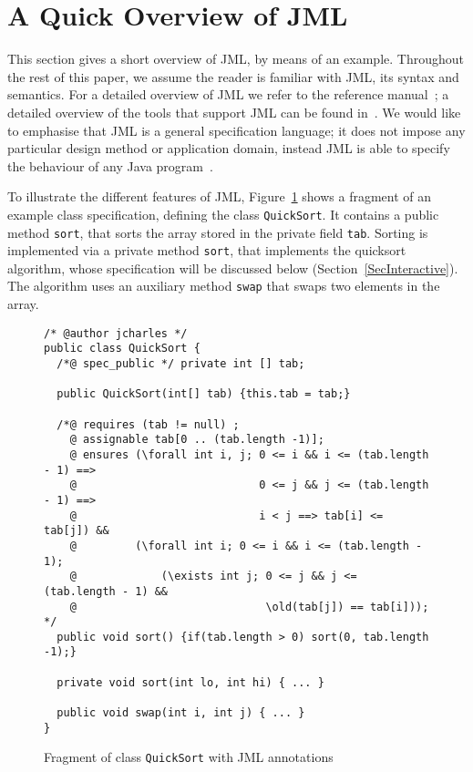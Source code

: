 \section{A Quick Overview of JML}\label{SecJML}


This section gives a short overview of JML, by means of an
example. Throughout the rest of this paper, we assume the reader is
familiar with JML, its syntax and semantics. For a detailed overview
of JML we refer to the reference manual~\cite{JMLReferenceManual05}; a
detailed overview of the tools that support JML can be found
in~\cite{BurdyCCEKLLP05}.  We would like to emphasise that JML is a
general specification language; it does not impose any particular
design method or application domain, instead JML is able to specify
the behaviour of any Java program~\cite{LeavensBR06}.



To illustrate the different features of JML, Figure~\ref{FigJMLSpec}
shows a fragment of an example class specification, defining the class
\texttt{QuickSort}. It contains a public method
\texttt{sort}, that sorts the array stored in the private field
\texttt{tab}. Sorting is implemented via a private method
\texttt{sort}, that implements the quicksort algorithm, whose
specification will be discussed below
(Section~\ref{SecInteractive}). The algorithm uses an auxiliary method
\texttt{swap} that swaps two elements in the array.

\begin{figure}[t!]
{\small
\begin{verbatim}
/* @author jcharles */
public class QuickSort {
  /*@ spec_public */ private int [] tab;

  public QuickSort(int[] tab) {this.tab = tab;}

  /*@ requires (tab != null) ;
    @ assignable tab[0 .. (tab.length -1)];
    @ ensures (\forall int i, j; 0 <= i && i <= (tab.length - 1) ==> 
    @                            0 <= j && j <= (tab.length - 1) ==>
    @                            i < j ==> tab[i] <= tab[j]) &&
    @         (\forall int i; 0 <= i && i <= (tab.length - 1); 
    @             (\exists int j; 0 <= j && j <= (tab.length - 1) && 
    @                             \old(tab[j]) == tab[i])); */
  public void sort() {if(tab.length > 0) sort(0, tab.length -1);}

  private void sort(int lo, int hi) { ... }

  public void swap(int i, int j) { ... }
}
\end{verbatim}
}
\vspace*{-1em}\caption{Fragment of class \texttt{QuickSort} with JML annotations} 
\label{FigJMLSpec}
\end{figure}

